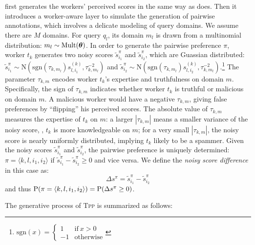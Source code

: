 \tpp{} first generates the workers' perceived scores in the same way as \trm{}
does. Then it introduces a worker-aware layer to simulate the generation of
pairwise annotations, which involves a delicate modeling of query domains.  We
assume there are $M$ domains. For query $q_l$, its domain $m_l$ is drawn from a
multinomial distribution: $m_l \sim \mathrm{Mult}(\vect{\theta})$. In order to
generate the pairwise preference $\pi$, worker $t_k$ generates two noisy scores
$\tilde{s}_{i_1}^{\pi}$ and $\tilde{s}_{i_2}^\pi$, which are Guassian
distributed: $\tilde{s}_{i_1}^{\pi} \sim \mathrm{N}(\mathrm{sgn}(\tau_{k,m_l})
  s_{l,i_1}^{(k)}, \tau_{k,m_l}^{-2})$ and $\tilde{s}_{i_2}^{\pi} \sim
  \mathrm{N}(\mathrm{sgn}(\tau_{k,m_l}) s_{l,i_2}^{(k)},
\tau_{k,m_l}^{-2})$.\footnote{$\mathrm{sgn}(x) =\left\{  \begin{array}{ll} 1 &
\textrm{if}~x > 0 \\ -1 & \textrm{otherwise}\end{array} \right.$} The parameter
$\tau_{k,m}$ encodes worker $t_k$'s expertise and truthfulness on domain $m$.
Specifically, the sign of $\tau_{k,m}$ indicates whether worker $t_k$ is
truthful or malicious on domain $m$. A malicious worker would have a negative
$\tau_{k,m}$, giving false preferences by ``flipping'' his perceived scores.
The absolute value of $\tau_{k,m}$ measures the expertise of $t_k$ on $m$: a
larger $|\tau_{k,m}|$ means a smaller variance of the noisy score, \ie, $t_k$ is
more knowledgeable on $m$; for a very small $|\tau_{k,m}|$, the noisy score is
nearly uniformly distributed, implying $t_k$ likely to be a spammer. Given the
noisy scores $\tilde{s}_{i_1}^{\pi}$ and $\tilde{s}_{i_2}^\pi$, the pairwise
preference is uniquely determined: $\pi = \langle k, l, i_1, i_2 \rangle$ if
$\tilde{s}_{i_1}^{\pi} - \tilde{s}_{i_2}^{\pi}  \geq 0$ and vice versa.  We
define the \emph{noisy score difference} in this case as:
\begin{equation}
\Delta s^\pi =  \tilde{s}_{i_1}^{\pi} - \tilde{s}_{i_2}^{\pi}
\label{eq::tpp_deltas}
\end{equation}
and thus $\P(\pi = \langle k, l, i_1, i_2 \rangle) = \P(\Delta s^\pi \geq 0)$.

The generative process of \textsc{Tpp} is summarized as follows:

